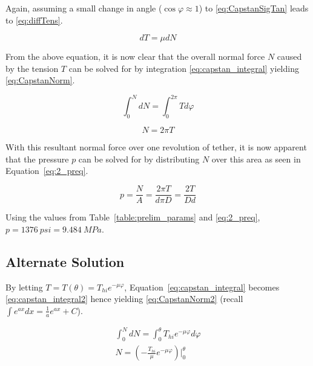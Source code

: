 Again, assuming a small change in angle ($\cos \varphi \approx 1$) to \ref{eq:CapstanSigTan} leads to \ref{eq:diffTens}.

\begin{equation}
	\label{eq:diffTens}
	dT = \mu dN
\end{equation}

From the above equation, it is now clear that the overall normal force $N$ caused by the tension $T$ can be solved for by integration \ref{eq:capstan_integral} yielding \ref{eq:CapstanNorm}.

\begin{equation}
	\label{eq:capstan_integral}
	\int_0^N dN =\int_0^{2\pi} T d\varphi
\end{equation}

\begin{equation}
	\label{eq:CapstanNorm}
	N=2\pi T	
\end{equation}

With this resultant normal force over one revolution of tether, it is now apparent that the pressure $p$ can be solved for by distributing $N$ over this area as seen in Equation~\ref{eq:2_preq}.

\begin{equation}
	\label{eq:2_preq}
	p=\frac{N}{A}=\frac{2\pi T}{d\pi D}=\frac{2T}{Dd}
\end{equation}

Using the values from Table~\ref{table:prelim_params} and \ref{eq:2_preq}, $p=1376\  psi= 9.484\  MPa$. 

\subsection{Alternate Solution}
\label{subsection:alt}

By letting $T = T(\theta)= T_{hi} e^{-\mu \varphi}$, Equation~\ref{eq:capstan_integral} becomes \ref{eq:capstan_integral2} hence yielding \ref{eq:CapstanNorm2} (recall $\int e^{ax} dx = \frac{1}{a} e^{ax} + C$).

\begin{equation}
	\label{eq:capstan_integral2}
	\begin{aligned}
		\int_0^N dN =\int_0^{\theta} T_{hi} e^{-\mu \varphi} d\varphi            \\
		N = \left( -\frac{T_{hi}}{\mu} e^{-\mu \varphi} \right) \Big|_0^{\theta} 
	\end{aligned}
\end{equation}

